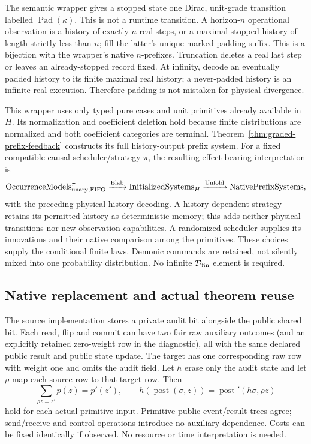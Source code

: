 \documentclass[11pt]{article}
\begin{document}
The semantic wrapper gives a stopped state one Dirac, unit-grade transition labelled $\operatorname{Pad}(\kappa)$. This is not a runtime transition. A horizon-$n$ operational observation is a history of exactly $n$ real steps, or a maximal stopped history of length strictly less than $n$; fill the latter's unique marked padding suffix. This is a bijection with the wrapper's native $n$-prefixes. Truncation deletes a real last step or leaves an already-stopped record fixed. At infinity, decode an eventually padded history to its finite maximal real history; a never-padded history is an infinite real execution. Therefore padding is not mistaken for physical divergence.

This wrapper uses only typed pure cases and unit primitives already available in $H$. Its normalization and coefficient deletion hold because finite distributions are normalized and both coefficient categories are terminal. Theorem~\ref{thm:graded-prefix-feedback} constructs its full history-output prefix system. For a fixed compatible causal scheduler/strategy $\pi$, the resulting effect-bearing interpretation is
\[
 \operatorname{OccurrenceModels}^{\pi}_{\rm unary,FIFO}
 \xrightarrow{\operatorname{Elab}}
 \operatorname{InitializedSystems}_H
 \xrightarrow{\operatorname{Unfold}}
 \operatorname{NativePrefixSystems},
\]
with the preceding physical-history decoding. A history-dependent strategy retains its permitted history as deterministic memory; this adds neither physical transitions nor new observation capabilities. A randomized scheduler supplies its innovations and their native comparison among the primitives. These choices supply the conditional finite laws. Demonic commands are retained, not silently mixed into one probability distribution. No infinite $\mathcal D_{\rm fin}$ element is required.

\subsection{Native replacement and actual theorem reuse}

The source implementation stores a private audit bit alongside the public shared bit. Each read, flip and commit can have two fair raw auxiliary outcomes (and an explicitly retained zero-weight row in the diagnostic), all with the same declared public result and public state update. The target has one corresponding raw row with weight one and omits the audit field. Let $h$ erase only the audit state and let $\rho$ map each source row to that target row. Then
\[
 \sum_{\rho z=z'}p(z)=p'(z'),\qquad
 h(\operatorname{post}(\sigma,z))
 =\operatorname{post}'(h\sigma,\rho z)
\]
hold for each actual primitive input. Primitive public event/result trees agree; send/receive and control operations introduce no auxiliary dependence. Costs can be fixed identically if observed. No resource or time interpretation is needed.
\end{document}
